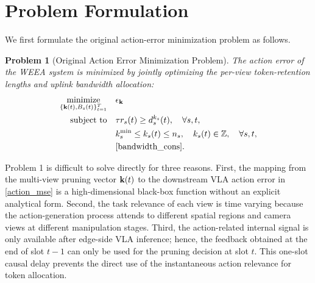 \documentclass[lettersize,journal]{IEEEtran}
\theoremstyle{custom}
\newtheorem{Prob}{Problem}
\begin{document}
\section{Problem Formulation}
We first formulate the original action-error minimization problem as follows.
\begin{Prob}[Original Action Error Minimization Problem]
    The action error of the WEEA system is minimized by jointly optimizing the per-view token-retention lengths and uplink bandwidth allocation:
    \begin{align}
        \underset{\{{\bf k}(t),B_s(t)\}_{t=1}^{T}}{\textrm{minimize}} \quad & \epsilon_{\bf k} \nonumber\\
        \textrm{subject to} \quad
        & \tau r_s(t) \geq d_s^{k_s}(t), \quad \forall s,t, \label{rate_cons}\\
        & k_s^{\min} \leq k_s(t) \leq n_s, \quad k_s(t)\in\mathbb{Z}, \quad \forall s,t, \label{k_cons}\\
        & \eqref{bandwidth_cons}. \nonumber
    \end{align}
\end{Prob}

Problem 1 is difficult to solve directly for three reasons. First, the mapping from the multi-view pruning vector ${\bf k}(t)$ to the downstream VLA action error in \eqref{action_mse} is a high-dimensional black-box function without an explicit analytical form. Second, the task relevance of each view is time varying because the action-generation process attends to different spatial regions and camera views at different manipulation stages. Third, the action-related internal signal is only available after edge-side VLA inference; hence, the feedback obtained at the end of slot $t-1$ can only be used for the pruning decision at slot $t$. This one-slot causal delay prevents the direct use of the instantaneous action relevance for token allocation.
\end{document}
